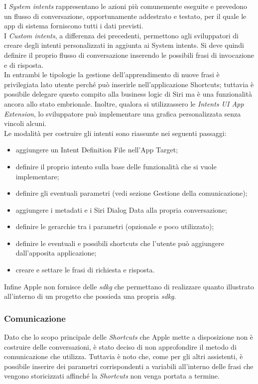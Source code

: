 		I \emph{System intents} rappresentano le azioni più comunemente eseguite e prevedono un flusso di conversazione, opportunamente addestrato e testato, per il quale le app di sistema forniscono tutti i dati previsti. \\
		I \emph{Custom intents}, a differenza dei precedenti, permettono agli sviluppatori di creare degli intenti personalizzati in aggiunta ai System intents. Si deve quindi definire il proprio flusso di conversazione inserendo le possibili frasi di invocazione e di risposta. \\
		In entrambi le tipologie la gestione dell’apprendimento di nuove frasi è privilegiata lato utente perché può inserirle nell'applicazione Shortcuts; tuttavia è possibile delegare questo compito alla business logic di Siri ma è una funzionalità ancora allo stato embrionale. Inoltre, qualora si utilizzassero le \emph{Intents UI App Extension}, lo sviluppatore può implementare una grafica personalizzata senza vincoli alcuni. \\
		Le modalità per costruire gli intenti sono riassunte nei seguenti passaggi:
		\begin{itemize}
			\item aggiungere un Intent Definition File nell’App Target;
			\item definire il proprio intento sulla base delle funzionalità che si vuole implementare;
			\item definire gli eventuali parametri (vedi sezione Gestione della comunicazione);
			\item aggiungere i metadati e i Siri Dialog Data alla propria conversazione;
			\item definire le gerarchie tra i parametri (opzionale e poco utilizzato);
			\item definire le eventuali e possibili shortcuts che l’utente può aggiungere dall'apposita applicazione;
			\item creare e settare le frasi di richiesta e risposta.
		\end{itemize}
		Infine Apple non fornisce delle \emph{\gls{sdkg}} che permettano di realizzare quanto illustrato all'interno di un progetto che possieda una propria \emph{\gls{sdkg}}.
		\subsubsection{Comunicazione}
		Dato che lo scopo principale delle \emph{Shortcuts} che Apple mette a disposizione non è costruire delle conversazioni, è stato deciso di non approfondire il metodo di comunicazione che utilizza. Tuttavia è noto che, come per gli altri assistenti, è possibile inserire dei parametri corrispondenti a variabili all'interno delle frasi che vengono storicizzati affinché la \emph{Shortcuts} non venga portata a termine.
